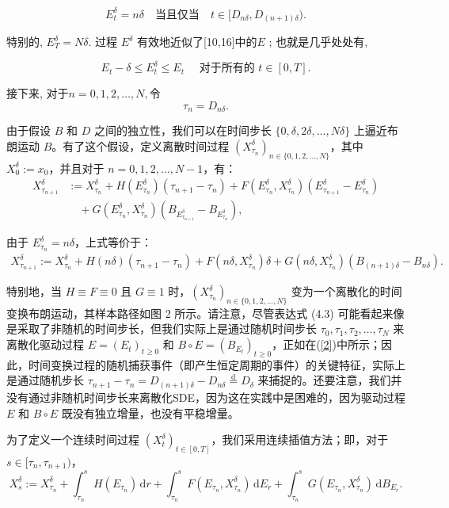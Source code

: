 \documentclass[12pt,final]{article}
\numberwithin{equation}{section}
\numberwithin{figure}{section}
\numberwithin{table}{section}
\theoremstyle{plain}
\begin{document}
	\[
	E_t^\delta = n\delta \quad \text{当且仅当} \quad t \in [D_{n\delta}, D_{(n+1)\delta}).
	\]
	
	特别的, $E_T^\delta=N\delta.$ 过程 $E^\delta$ 有效地近似了[10,16]中的$E$ ; 也就是几乎处处有, 
	
	\begin{equation}\label{1}
		E_t-\delta\leq E_t^\delta\leq E_t\quad\text{ 对于所有的 }t\in[0,T].
	\end{equation}
	
	接下来, 对于$n=0,1,2,\ldots,N,$令
	$$\tau_n=D_{n\delta}.$$
	
	由于假设 $B$ 和 $D$ 之间的独立性，我们可以在时间步长 $\{0, \delta, 2\delta, \ldots, N\delta\}$ 上逼近布朗运动 $B$。有了这个假设，定义离散时间过程 $(X_{\tau_n}^\delta)_{n \in \{0, 1, 2, \ldots, N\}}$，其中 $X_0^\delta := x_0$，并且对于 $n = 0, 1, 2, \ldots, N-1$，有：
	\begin{align}\label{2}
		X_{\tau_{n+1}}^\delta &:= X_{\tau_n}^\delta + H(E_{\tau_n}^\delta)(\tau_{n+1} - \tau_n) + F(E_{\tau_n}^\delta, X_{\tau_n}^\delta)(E_{\tau_{n+1}}^\delta - E_{\tau_n}^\delta) \\
		& \quad + G(E_{\tau_n}^\delta, X_{\tau_n}^\delta)(B_{E_{\tau_{n+1}}^\delta} - B_{E_{\tau_n}^\delta}),\nonumber
	\end{align}
	
	由于 $E_{\tau_n}^\delta = n\delta$，上式等价于：
	\begin{align}\label{3}
		X_{\tau_{n+1}}^\delta := X_{\tau_n}^\delta + H(n\delta)(\tau_{n+1} - \tau_n) + F(n\delta, X_{\tau_n}^\delta)\delta + G(n\delta, X_{\tau_n}^\delta)(B_{(n+1)\delta} - B_{n\delta}).
	\end{align}
	
	特别地，当 $H \equiv F \equiv 0$ 且 $G \equiv 1$ 时，$(X_{\tau_n}^\delta)_{n \in \{0, 1, 2, \ldots, N\}}$ 变为一个离散化的时间变换布朗运动，其样本路径如图 2 所示。请注意，尽管表达式 (4.3) 可能看起来像是采取了非随机的时间步长，但我们实际上是通过随机时间步长 $\tau_0, \tau_1, \tau_2, \ldots, \tau_N$ 来离散化驱动过程 $E = (E_t)_{t \geq 0}$ 和 $B \circ E = (B_{E_t})_{t \geq 0}$，正如在(\ref{2})中所示；因此，时间变换过程的随机捕获事件（即产生恒定周期的事件）的关键特征，实际上是通过随机步长 $\tau_{n+1} - \tau_n = D_{(n+1)\delta} - D_{n\delta} \overset{\mathrm{d}}{=} D_\delta$ 来捕捉的。还要注意，我们并没有通过非随机时间步长来离散化SDE，因为这在实践中是困难的，因为驱动过程 $E$ 和 $B \circ E$ 既没有独立增量，也没有平稳增量。
	
	为了定义一个连续时间过程 $(X_t^\delta)_{t \in [0, T]}$，我们采用连续插值方法；即，对于 $s \in [\tau_n, \tau_{n+1})$，
	\begin{equation}\label{4}
		X_s^\delta := X_{\tau_n}^\delta + \int_{\tau_n}^s H(E_{\tau_n}) \, \mathrm{d}r + \int_{\tau_n}^s F(E_{\tau_n}, X_{\tau_n}^\delta) \, \mathrm{d}E_r + \int_{\tau_n}^s G(E_{\tau_n}, X_{\tau_n}^\delta) \, \mathrm{d}B_{E_r}.
	\end{equation}
	
\end{document}

